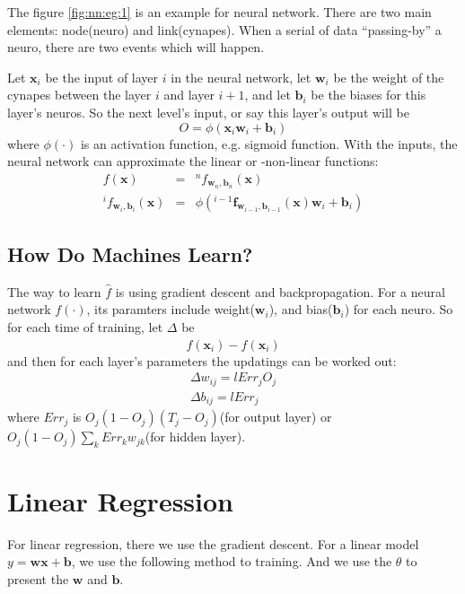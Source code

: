 \documentclass{article}
\begin{document}
The figure \ref{fig:nn:eg:1} is an example for neural network.
There are two main elements: node(neuro) and link(cynapes).
When a serial of data ``passing-by'' a neuro, there are two events which will happen.

Let $\mathbf{x}_i$ be the input of layer $i$ in the neural network, let $\mathbf{w}_i$
be the weight of the cynapes between the layer $i$ and layer $i+1$,
and let $\mathbf{b}_i$ be the biases for this layer's neuros.
So the next level's input, or say this layer's output will be
$$
  O = \phi\left(\mathbf{x}_i\mathbf{w}_i + \mathbf{b}_i\right)
$$
where $\phi(\cdot)$ is an activation function, e.g. sigmoid function.
With the inputs, the neural network can approximate the linear or -non-linear functions:
\begin{equation}
  \label{eq:nn:app}
  \begin{array}{rcl}
  f(\mathbf{x}) &=& ^nf_{\mathbf{w}_n,\mathbf{b}_n}(\mathbf{x}) \\
  {}^if_{\mathbf{w}_i,\mathbf{b}_i}(\mathbf{x}) &=& \phi\left({}^{i-1}\mathbf{f}_{\mathbf{w}_{i-1},\mathbf{b}_{i-1}}(\mathbf{x})\mathbf{w}_i + \mathbf{b}_i\right)
  \end{array}
\end{equation}

\subsection{How Do Machines Learn?}
\label{sec:nn:how}

The way to learn $\hat{f}$ is using gradient descent and backpropagation.
For a neural network $f(\cdot)$, its paramters include weight($\mathbf{w}_i$),
and bias($\mathbf{b}_i$) for each neuro. So for each time of training, 
let $\Delta$ be
$$
 f(\mathbf{x}_i) - \hat{f}(\mathbf{x}_i)
$$
and then for each layer's parameters the updatings can be worked out:
\begin{align*}
  \Delta w_{ij} = l{Err_jO_j} \\
  \Delta b_{ij} = l{Err_j}
\end{align*}
where $Err_j$ is $O_j(1-O_j)(T_j-O_j)$(for output layer) or $O_j(1-O_j)\sum\limits_kErr_kw_{jk}$(for hidden layer).


\section{Linear Regression}
\label{sec:lreg}

For linear regression, there we use the gradient descent.
For a linear model $y=\mathbf{w}\mathbf{x}+\mathbf{b}$, we use the following method to training.
And we use the $\theta$ to present the $\mathbf{w}$ and $\mathbf{b}$.
\end{document}
